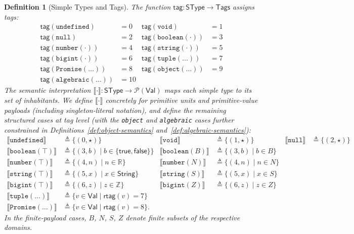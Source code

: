 \documentclass[11pt]{article}
\newtheorem{definition}[theorem]{Definition}
\newcommand{\sem}[1]{\llbracket #1 \rrbracket}
\newcommand{\String}{\mathsf{String}}
\newcommand{\SType}{\mathsf{SType}}
\newcommand{\Tags}{\mathsf{Tags}}
\newcommand{\tagfn}{\mathsf{tag}}
\newcommand{\rtag}{\mathsf{rtag}}
\newcommand{\Val}{\mathsf{Val}}
\begin{document}
\begin{definition}[Simple Types and Tags]
\label{def:simple-types-and-tags}
The function $\tagfn : \SType \to \Tags$ assigns tags:
\begin{align*}
\tagfn(\texttt{undefined}) &= 0 & \tagfn(\texttt{void}) &= 1 \\
\tagfn(\texttt{null}) &= 2 & \tagfn(\texttt{boolean}(\cdot)) &= 3 \\
\tagfn(\texttt{number}(\cdot)) &= 4 & \tagfn(\texttt{string}(\cdot)) &= 5 \\
\tagfn(\texttt{bigint}(\cdot)) &= 6 & \tagfn(\texttt{tuple}(\ldots)) &= 7 \\
\tagfn(\texttt{Promise}(\ldots)) &= 8 & \tagfn(\texttt{object}(\ldots)) &= 9 \\
\tagfn(\texttt{algebraic}(\ldots)) &= 10
\end{align*}
The semantic interpretation $\sem{\cdot} : \SType \to \mathcal{P}(\Val)$ maps each simple type to its set of inhabitants.
We define $\sem{\cdot}$ concretely for primitive units and primitive-value payloads (including singleton-literal notation), and define the remaining structured cases at tag level
(with the \texttt{object} and \texttt{algebraic} cases further constrained in Definitions~\ref{def:object-semantics} and~\ref{def:algebraic-semantics}):
\begin{align*}
\sem{\texttt{undefined}} &\triangleq \{(0,\star)\} &
\sem{\texttt{void}} &\triangleq \{(1,\star)\} &
\sem{\texttt{null}} &\triangleq \{(2,\star)\} \\[4pt]
\sem{\texttt{boolean}(\top)} &\triangleq \{(3,b) \mid b \in \{\mathsf{true},\mathsf{false}\}\} &
\sem{\texttt{boolean}(B)} &\triangleq \{(3,b) \mid b \in B\} \\
\sem{\texttt{number}(\top)} &\triangleq \{(4,n) \mid n \in \mathbb{R}\} &
\sem{\texttt{number}(N)} &\triangleq \{(4,n) \mid n \in N\} \\
\sem{\texttt{string}(\top)} &\triangleq \{(5,x) \mid x \in \String\} &
\sem{\texttt{string}(S)} &\triangleq \{(5,x) \mid x \in S\} \\
\sem{\texttt{bigint}(\top)} &\triangleq \{(6,z) \mid z \in \mathbb{Z}\} &
\sem{\texttt{bigint}(Z)} &\triangleq \{(6,z) \mid z \in Z\} \\[4pt]
\sem{\texttt{tuple}(\ldots)} &\triangleq \{ v \in \Val \mid \rtag(v)=7\} \\
\sem{\texttt{Promise}(\ldots)} &\triangleq \{ v \in \Val \mid \rtag(v)=8\}.
\end{align*}
In the finite-payload cases, $B$, $N$, $S$, $Z$ denote finite subsets of the respective domains.
\end{definition}
\end{document}
